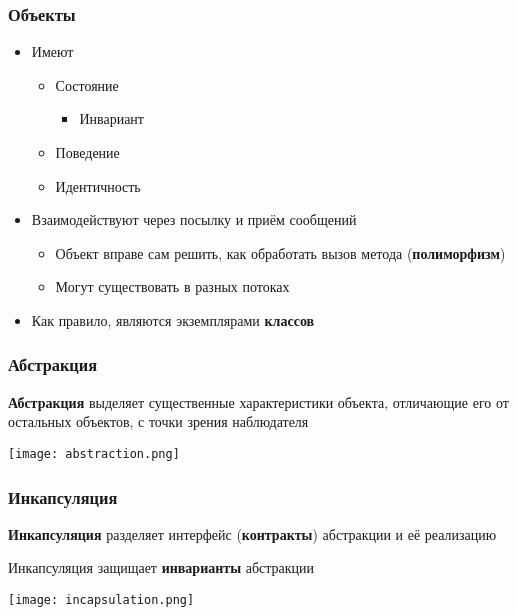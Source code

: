 \documentclass{../../slides-style}
\begin{document}
    \begin{frame}
        \frametitle{Объекты}
        \begin{itemize}
            \item Имеют
            \begin{itemize}
                \item Состояние
                \begin{itemize}
                    \item Инвариант
                \end{itemize}
                \item Поведение
                \item Идентичность
            \end{itemize}
            \item Взаимодействуют через посылку и приём сообщений
            \begin{itemize}
                \item Объект вправе сам решить, как обработать вызов метода (\textbf{полиморфизм})
                \item Могут существовать в разных потоках
            \end{itemize}
            \item Как правило, являются экземплярами \textbf{классов}
        \end{itemize}
    \end{frame}

    \begin{frame}
        \frametitle{Абстракция}
        \textbf{Абстракция} выделяет существенные характеристики объекта, отличающие его от остальных объектов, с точки зрения наблюдателя
        \vskip 1cm
        \begin{center}
            \texttt{[image: abstraction.png]}
        \end{center}
    \end{frame}

    \begin{frame}
        \frametitle{Инкапсуляция}
        \textbf{Инкапсуляция} разделяет интерфейс (\textbf{контракты}) абстракции и её реализацию

        Инкапсуляция защищает \textbf{инварианты} абстракции
        \vskip 1cm
        \begin{center}
            \texttt{[image: incapsulation.png]}
        \end{center}
    \end{frame}
\end{document}
